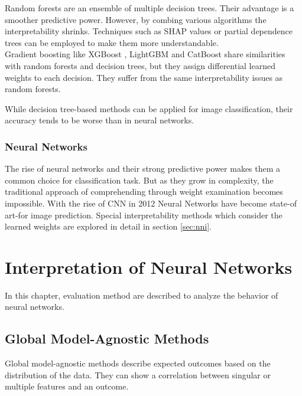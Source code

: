 Random forests are an ensemble of multiple decision trees. Their advantage is a smoother predictive power. However, by combing various algorithms the interpretability shrinks. Techniques such as SHAP values \cite{lundberg2017unified} or partial dependence trees can be employed to make them more understandable.
\\
Gradient boosting like XGBoost \cite{Chen_2016}, LightGBM \cite{Ke2017} and CatBoost \cite{prokhorenkova2019catboost} share similarities with random forests and decision trees, but they assign differential learned weights to each decision. They suffer from the same interpretability issues as random forests.

While decision tree-based methods can be applied for image classification, their accuracy tends to be worse than in neural networks.


\subsection{Neural Networks}

The rise of neural networks and their strong predictive power makes them a common choice for classification task. But as they grow in complexity, the traditional approach of comprehending through weight examination becomes impossible. With the rise of CNN in 2012  \cite{krizhevsky2012nn} Neural Networks have become state-of art-for image prediction. Special interpretability methods which consider the learned weights are explored in detail in section \ref{sec:nni}.

\chapter{Interpretation of Neural Networks}

In this chapter, evaluation method are described to analyze the behavior of neural networks. 

\section{Global Model-Agnostic Methods}

Global model-agnostic methods describe expected outcomes based on the distribution of the data. They can show a correlation between singular or multiple features and an outcome.

